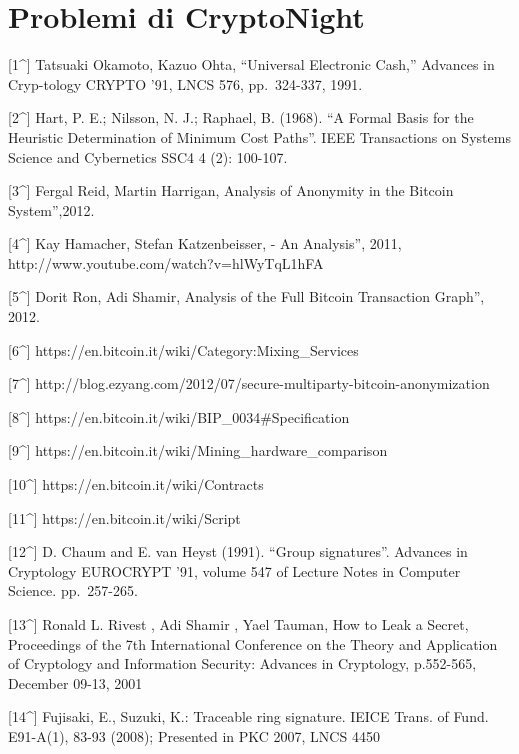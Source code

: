 
\section{Problemi di CryptoNight}\label{problemi-di-cryptonight}

{[}1\^{}{]} Tatsuaki Okamoto, Kazuo Ohta, ``Universal Electronic Cash,''
Advances in Cryp-tology \textbar{} CRYPTO '91, LNCS 576, pp.~324-337,
1991.

{[}2\^{}{]} Hart, P. E.; Nilsson, N. J.; Raphael, B. (1968). ``A Formal
Basis for the Heuristic Determination of Minimum Cost Paths''. IEEE
Transactions on Systems Science and Cybernetics SSC4 4 (2): 100-107.

{[}3\^{}{]} Fergal Reid, Martin Harrigan, \An Analysis of Anonymity in
the Bitcoin System'',2012.

{[}4\^{}{]} Kay Hamacher, Stefan Katzenbeisser, \Bitcoin - An
Analysis'', 2011, http://www.youtube.com/watch?v=hlWyTqL1hFA

{[}5\^{}{]} Dorit Ron, Adi Shamir, \Quantitative Analysis of the Full
Bitcoin Transaction Graph'', 2012.

{[}6\^{}{]} https://en.bitcoin.it/wiki/Category:Mixing\_Services

{[}7\^{}{]}
http://blog.ezyang.com/2012/07/secure-multiparty-bitcoin-anonymization

{[}8\^{}{]} https://en.bitcoin.it/wiki/BIP\_0034\#Specification

{[}9\^{}{]} https://en.bitcoin.it/wiki/Mining\_hardware\_comparison

{[}10\^{}{]} https://en.bitcoin.it/wiki/Contracts

{[}11\^{}{]} https://en.bitcoin.it/wiki/Script

{[}12\^{}{]} D. Chaum and E. van Heyst (1991). ``Group signatures''.
Advances in Cryptology\textbar{} EUROCRYPT '91, volume 547 of Lecture
Notes in Computer Science. pp.~257-265.

{[}13\^{}{]} Ronald L. Rivest , Adi Shamir , Yael Tauman, How to Leak a
Secret, Proceedings of the 7th International Conference on the Theory
and Application of Cryptology and Information Security: Advances in
Cryptology, p.552-565, December 09-13, 2001

{[}14\^{}{]} Fujisaki, E., Suzuki, K.: Traceable ring signature. IEICE
Trans. of Fund. E91-A(1), 83-93 (2008); Presented in PKC 2007, LNCS 4450

